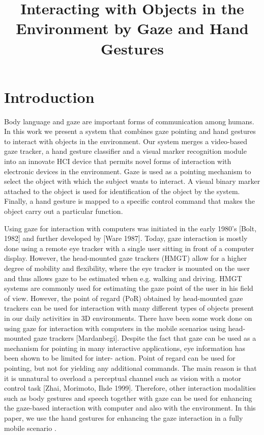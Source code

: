 \documentclass[jou,a4paper,notxfonts]{apa}
\title{Interacting with Objects in the Environment by Gaze and Hand Gestures}
\begin{document}
\maketitle

\thispagestyle{plain}

\section{Introduction} 
Body language and gaze are important forms of communication among humans. In this work we present a system that combines gaze pointing and hand gestures to interact with objects in the environment. Our system merges a video-based gaze tracker, a hand gesture classifier and a visual marker recognition module into an innovate HCI device that permits novel forms of interaction with electronic devices in the environment. Gaze is used as a pointing mechanism to select the object with which the subject wants to interact. A visual binary marker attached to the object is used for identification of the object by the system. Finally, a hand gesture is mapped to a specific control command that makes the object carry out a particular function.

Using gaze for interaction with computers was initiated in the early 1980’s [Bolt, 1982] and further developed by [Ware 1987]. Today, gaze interaction is mostly done using a remote eye tracker with a single user sitting in front of a computer display. However, the head-mounted gaze trackers (HMGT) allow for a higher degree of mobility and flexibility, where the eye tracker is mounted on the user and thus allows gaze to be estimated when e.g. walking and driving. HMGT systems are commonly used for estimating the gaze point of the user in his field of view. However, the point of regard (PoR) obtained by head-mounted gaze trackers can be used for interaction with many different types of objects present in our daily activities in 3D environments. There have been some work done on using gaze for interaction with computers in the mobile scenarios using head-mounted gaze trackers [Mardanbegi]. Despite the fact that gaze can be used as a mechanism for pointing in many interactive applications, eye information has been shown to be limited for inter- action. Point of regard can be used for pointing, but not for yielding any additional commands. The main reason is that it is unnatural to overload a perceptual channel such as vision with a motor control task [Zhai, Morimoto, Ihde 1999]. Therefore, other interaction modalities such as body gestures and speech together with gaze can be used for enhancing the gaze-based interaction with computer and also with the environment. 
 In this paper, we use the hand gestures for enhancing the gaze interaction in a fully mobile scenario . 
 
\end{document}
